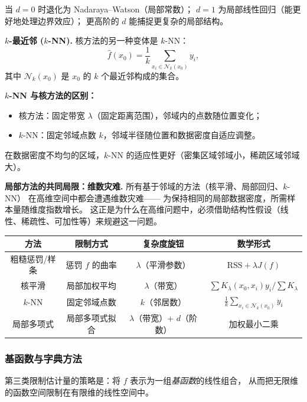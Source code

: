 当 $d = 0$ 时退化为 Nadaraya--Watson（局部常数）；
$d = 1$ 为局部线性回归（能更好地处理边界效应）；
更高阶的 $d$ 能捕捉更复杂的局部结构。

\medskip
\textbf{$k$-最近邻 ($k$-NN).} 核方法的另一种变体是 $k$-NN：
\begin{equation}
    \hat{f}(x_0) = \frac{1}{k} \sum_{x_i \in \mathcal{N}_k(x_0)} y_i,
\end{equation}
其中 $\mathcal{N}_k(x_0)$ 是 $x_0$ 的 $k$ 个最近邻构成的集合。

\textbf{$k$-NN 与核方法的区别：}
\begin{itemize}
    \item 核方法：固定带宽 $\lambda$（固定距离范围），邻域内的点数随位置变化；
    \item $k$-NN：固定邻域点数 $k$，邻域半径随位置和数据密度自适应调整。
\end{itemize}
在数据密度不均匀的区域，$k$-NN 的适应性更好（密集区域邻域小，稀疏区域邻域大）。

\medskip
\textbf{局部方法的共同局限：维数灾难.} 所有基于邻域的方法（核平滑、局部回归、$k$-NN）
在高维空间中都会遭遇维数灾难——
为保持相同的局部数据密度，所需样本量随维度指数增长。
这正是为什么在高维问题中，必须借助结构性假设（线性、稀疏性、可加性等）来规避这一问题。

\begin{center}
\renewcommand{\arraystretch}{1.4}
\begin{tabular}{c|c|c|c}
\toprule
\textbf{方法} & \textbf{限制方式} & \textbf{复杂度旋钮} & \textbf{数学形式} \\
\midrule
粗糙惩罚/样条 & 惩罚 $f$ 的曲率 & $\lambda$（平滑参数） & $\mathrm{RSS} + \lambda J(f)$ \\
核平滑 & 局部加权平均 & $\lambda$（带宽） & $\sum K_\lambda(x_0, x_i) y_i / \sum K_\lambda$ \\
$k$-NN & 固定邻域点数 & $k$（邻居数） & $\frac{1}{k}\sum_{x_i \in \mathcal{N}_k(x_0)} y_i$ \\
局部多项式 & 局部多项式拟合 & $\lambda$（带宽）+ $d$（阶数） & 加权最小二乘 \\
\bottomrule
\end{tabular}
\end{center}

\subsubsection{基函数与字典方法}

第三类限制估计量的策略是：将 $f$ 表示为一组\emph{基函数}的线性组合，
从而把无限维的函数空间限制在有限维的线性空间中。

